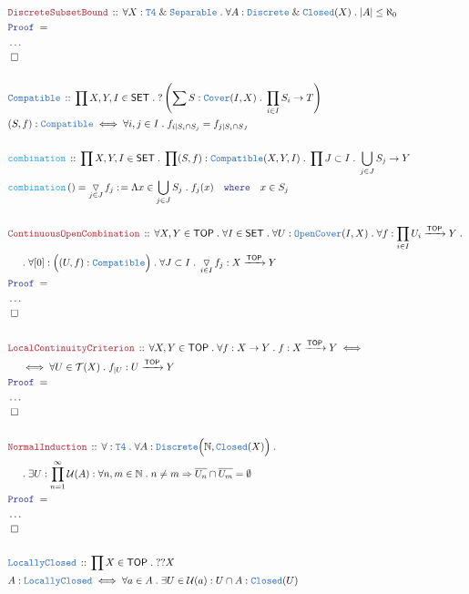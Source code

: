 \documentclass[12pt]{scrartcl}
\newcommand{\TYPE}[1]{\textcolor{NavyBlue}{\mathtt{#1}}}
\newcommand{\FUNC}[1]{\textcolor{Cerulean}{\mathtt{#1}}}
\newcommand{\LOGIC}[1]{\textcolor{Blue}{\mathtt{#1}}}
\newcommand{\THM}[1]{\textcolor{Maroon}{\mathtt{#1}}}
\renewcommand{\.}{\; . \;}
\newcommand{\de}{: \kern 0.1pc =}
\newcommand{\where}{\LOGIC{where}}
\newcommand{\Act}[1]{\left( #1 \right)}
\newcommand{\Theorem}[2]{& \THM{#1} \, :: \, #2 \\ & \Proof = \\ }
\newcommand{\DeclareType}[2]{& \TYPE{#1} \, :: \, #2 \\}
\newcommand{\DefineType}[3]{& #1 : \TYPE{#2} \iff #3 \\}
\newcommand{\DeclareFunc}[2]{& \FUNC{#1} \, :: \, #2 \\}
\newcommand{\DefineNamedFunc}[4]{&  \FUNC{#1}\Act{#2} = #3 \de #4 \\}
\newcommand{\NewLine}{\\ & \kern 1pc}
\newcommand{\Page}[1]{ \begin{align*} #1 \end{align*}   }
\newcommand{\NoProof}{ & \ldots \\ \EndProof}
\renewcommand{\And}{\; \& \;}
\newcommand{\Imply}{\Rightarrow}
\newcommand{\Nat}{\mathbb{N} }
\newcommand{\Arrow}{\xrightarrow}
\newcommand{\QED}{\; \square}
\newcommand{\EndProof}{& \QED \\}
\newcommand{\Proof}{\LOGIC{Proof} \; }
\newcommand{\SET}{\mathsf{SET}}
\DeclareMathOperator{\combo}{\triangledown}
\newcommand{\TOP}{\mathsf{TOP}}
\newcommand{\T}{\mathcal{T}}
\renewcommand{\U}{\mathcal{U}}
\begin{document}
\Page{
	\Theorem{DiscreteSubsetBound}
	{
		\forall X : \TYPE{T4} \And \TYPE{Separable} \.
		\forall A : \TYPE{Discrete} \And \TYPE{Closed}(X) \. 
		|A| \le \aleph_0
	}
	\NoProof
	\\
	\DeclareType{Compatible}{ \prod X,Y,I \in \SET \. ?\left( \sum S : \TYPE{Cover}(I,X) \. \prod_{i \in I} S_i \to T\right) }
	\DefineType{(S,f)}{Compatible}{\forall i,j \in I \. f_{i|S_i \cap S_j} = f_{j|S_i \cap S_J}}
	\\
	\DeclareFunc{combination}{
		\prod X,Y,I \in \SET \. 
		\prod (S,f) : \TYPE{Compatible}(X,Y,I) \. 
		\prod J \subset I \. \bigcup_{j \in J} S_j \to Y 
	}
	\DefineNamedFunc{combination}{}{\combo_{j \in J} f_j}{\Lambda x \in \bigcup_{j \in J} S_j \. f_j(x) 
		\quad  \where \quad x \in S_j} 
	\\
	\Theorem{ContinuousOpenCombination}
	{
		\forall X,Y \in \TOP \. \forall I \in \SET \.
		\forall U : \TYPE{OpenCover}(I,X) \. 
		\forall f : \prod_{i \in I}  U_i \Arrow{\TOP} Y \. \NewLine \. 
		\forall [0] : \Big( (U,f) : \TYPE{Compatible}  \Big) \.
		\forall J \subset I \. 
		\combo_{i \in I} f_j : X \Arrow{\TOP} Y
	}
	\NoProof
	\\
	\Theorem{LocalContinuityCriterion}
	{
		\forall X,Y \in \TOP \.
		\forall f : X \to Y \.
		f : X \Arrow{\TOP} Y 
		\iff \NewLine \iff 
		\forall U \in \T(X) \.
		f_{|U} : U \Arrow{\TOP} Y
	}
	\NoProof
	\\
	\Theorem{NormalInduction}
	{
		\forall : \TYPE{T4} \.
		\forall A : \TYPE{Discrete}\Big(\Nat, \TYPE{Closed}(X) \Big) \. \NewLine \.
		\exists U :\prod^\infty_{n = 1} \U(A) :
		\forall n,m \in \Nat \. n \neq m \Imply \overline{U_n} \cap \overline{U_m} = \emptyset
	}
	\NoProof
	\\
	\DeclareType{LocallyClosed}{ \prod X \in \TOP \. ??X}
	\DefineType{A}{LocallyClosed}{\forall a \in A \. \exists U \in \U(a) : U \cap A : \TYPE{Closed}(U) }
}
\end{document}

